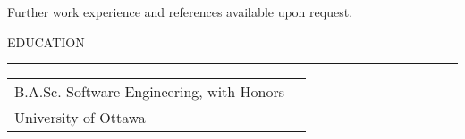 \documentclass[12pt]{article}
\makeatletter
\newenvironment{justifycolumns}
{\begin{tabular*}{\textwidth}{@{\extracolsep{\fill}} lr@{}}}
{\end{tabular*}}
\newcommand{\row}[2]{#1 & #2 \\}
\newcommand{\blockseparation}{\vspace{0.13in}}
\newcommand{\heading}[1]{
	\vspace{0.05in}
	\uppercase{#1}
	\vspace{0.05in}
	\hrule
	\blockseparation
}
\newcommand{\bulletheading}[1]{
	\vspace{0.075in}
	\hspace{0.1in}
	{#1}
	\vspace{0.03in}
}
\makeatother
\begin{document}
\begin{flushleft}
\bulletheading{\small{Further work experience and references available upon request.}}

\blockseparation

\heading{Education}
\begin{justifycolumns}
	\row{B.A.Sc. Software Engineering, with Honors}{}
	\row{University of Ottawa}{}
\end{justifycolumns}


\end{flushleft}
\end{document}
